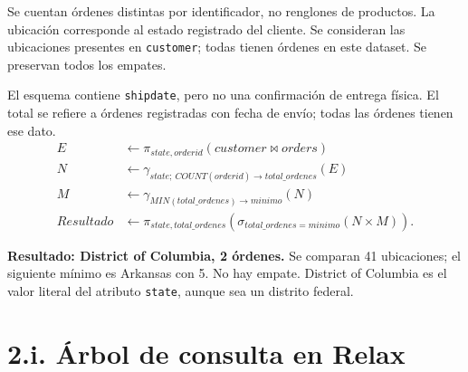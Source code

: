 Se cuentan órdenes distintas por identificador, no renglones de productos. La ubicación corresponde al estado registrado del cliente. Se consideran las ubicaciones presentes en \texttt{customer}; todas tienen órdenes en este dataset. Se preservan todos los empates.

El esquema contiene \texttt{shipdate}, pero no una confirmación de entrega física. El total se refiere a órdenes registradas con fecha de envío; todas las órdenes tienen ese dato.
\begin{align*}
E &\leftarrow \pi_{state,orderid}(customer\bowtie orders)\\
N &\leftarrow \gamma_{state;\ COUNT(orderid)\to total\_ordenes}(E)\\
M &\leftarrow \gamma_{MIN(total\_ordenes)\to minimo}(N)\\
Resultado &\leftarrow \pi_{state,total\_ordenes}(\sigma_{total\_ordenes=minimo}(N\times M)).
\end{align*}

\textbf{Resultado: District of Columbia, 2 órdenes.} Se comparan 41 ubicaciones; el siguiente mínimo es Arkansas con 5. No hay empate. District of Columbia es el valor literal del atributo \texttt{state}, aunque sea un distrito federal.
\newpage\section*{2.i. Árbol de consulta en Relax}
